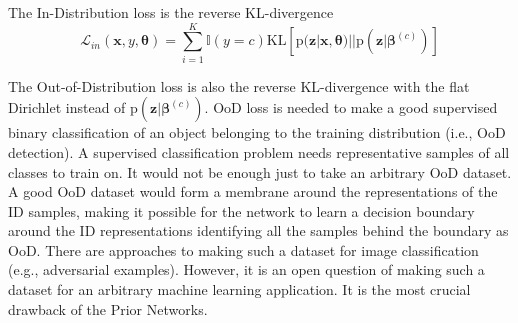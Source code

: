 \documentclass{article}
\begin{document}
The In-Distribution loss is the reverse KL-divergence \cite{reverse_kl}
\begin{equation}
\mathcal{L}_{in} (\boldsymbol{x}, y, \boldsymbol{\theta}) = \sum_{i=1}^K \mathbb{I}(y = c) \textrm{KL}[ \mathrm{p} (\boldsymbol{z} | \boldsymbol{x}, \boldsymbol{\theta}) || \mathrm{p} (\boldsymbol{z} | \boldsymbol{\beta}^{(c)})]
\end{equation}

The Out-of-Distribution loss is also the reverse KL-divergence with the flat Dirichlet instead of $\mathrm{p} (\boldsymbol{z} | \boldsymbol{\beta}^{(c)})$.
OoD loss is needed to make a good supervised binary classification of an object belonging to the training distribution (i.e., OoD detection).
A supervised classification problem needs representative samples of all classes to train on.
It would not be enough just to take an arbitrary OoD dataset.
A good OoD dataset would form a membrane around the representations of the ID samples, making it possible for the network to learn a decision boundary around the ID representations identifying all the samples behind the boundary as OoD.
There are approaches to making such a dataset for image classification (e.g., adversarial examples). However, it is an open question of making such a dataset for an arbitrary machine learning application.
It is the most crucial drawback of the Prior Networks.
\end{document}
